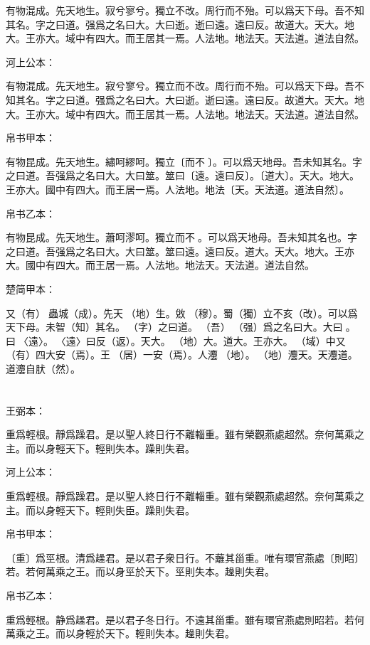 \documentclass[a5paper]{ctexbook}
\begin{document}
    有物混成。先天地生。寂兮寥兮。獨立不改。周行而不殆。可以爲天下母。吾不知其名。字之曰道。强爲之名曰大。大曰逝。逝曰遠。遠曰反。故道大。天大。地大。王亦大。域中有四大。而王居其一焉。人法地。地法天。天法道。道法自然。

    河上公本：

    有物混成。先天地生。寂兮寥兮。獨立而不改。周行而不殆。可以爲天下母。吾不知其名。字之曰道。强爲之名曰大。大曰逝。逝曰遠。遠曰反。故道大。天大。地大。王亦大。域中有四大。而王居其一焉。人法地。地法天。天法道。道法自然。

    帛书甲本：

    有物昆成。先天地生。繡呵繆呵。獨立〔而不󱁡〕。可以爲天地母。吾未知其名。字之曰道。吾强爲之名曰大。大曰筮。筮曰〔遠。遠曰反〕。〔道大〕。天大。地大。王亦大。國中有四大。而王居一焉。人法地。地法〔天。天法道。道法自然〕。

    帛书乙本：

    有物昆成。先天地生。蕭呵漻呵。獨立而不󱁡。可以爲天地母。吾未知其名也。字之曰道。吾强爲之名曰大。大曰筮。筮曰遠。遠曰反。道大。天大。地大。王亦大。國中有四大。而王居一焉。人法地。地法天。天法道。道法自然。

    楚简甲本：

    又（有）󶴷蟲城（成）。先天󶴵（地）生。敓󶴸（穆）。蜀（獨）立不亥（改）。可以爲天下母。未智（知）其名。󼼐（字）之曰道。󼾲（吾）󶴔（强）爲之名曰大。大曰󶴹。󶴹曰󶴿〈遠〉。󶴿〈遠〉曰反（返）。天大。󶴵（地）大。道大。王亦大。󶴺（域）中又（有）四大安（焉）。王󶵀（居）一安（焉）。人灋󶴵（地）。󶴵（地）灋天。天灋道。道灋自肰（然）。

    \chapter{}
    王弼本：

    重爲輕根。靜爲躁君。是以聖人終日行不離輜重。雖有榮觀燕處超然。奈何萬乘之主。而以身輕天下。輕則失本。躁則失君。

    河上公本：

    重爲輕根。靜爲躁君。是以聖人終日行不離輜重。雖有榮觀燕處超然。奈何萬乘之主。而以身輕天下。輕則失臣。躁則失君。

    帛书甲本：

    〔重〕爲巠根。清爲趮君。是以君子衆日行。不蘺其甾重。唯有環官燕處〔則昭〕若。若何萬乘之王。而以身巠於天下。巠則失本。趮則失君。

    帛书乙本：

    重爲輕根。静爲趮君。是以君子冬日行。不遠其甾重。雖有環官燕處則昭若。若何萬乘之王。而以身輕於天下。輕則失本。趮則失君。
\end{document}
